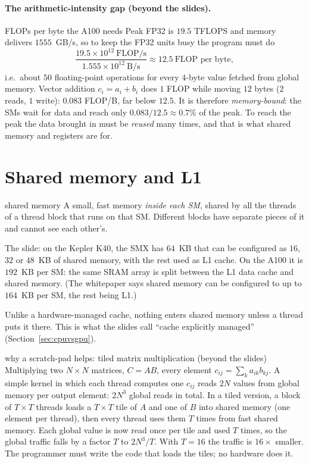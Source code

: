 \paragraph{The arithmetic-intensity gap (beyond the slides).}
\begin{workedex}{FLOPs per byte the A100 needs}
Peak FP32 is $19.5$ TFLOPS and memory delivers $1555$~GB/s, so to keep the FP32 units busy the program must do
\[
 \frac{19.5\times10^{12}\ \text{FLOP/s}}{1.555\times10^{12}\ \text{B/s}}\approx12.5\ \text{FLOP per byte},
\]
i.e.\ about $50$ floating-point operations for every $4$-byte value fetched from global memory. Vector addition $c_i=a_i+b_i$ does $1$ FLOP while moving $12$ bytes ($2$ reads, $1$ write): $0.083$ FLOP/B, far below $12.5$.
It is therefore \emph{memory-bound}: the SMs wait for data and reach only $0.083/12.5\approx0.7\%$ of the peak. To reach the peak the data brought in must be \emph{reused} many times, and that is what shared memory and registers are for.
\end{workedex}

\section{Shared memory and L1}


\begin{definition}{shared memory}
A small, fast memory \emph{inside each SM}, shared by all the threads of a thread block that runs on that SM. Different blocks have separate pieces of it and cannot see each other's.
\end{definition}
The slide: on the Kepler K40, the SMX has $64$~KB that can be configured as $16$, $32$ or $48$~KB of shared memory, with the rest used as L1 cache.
On the A100 it is $192$~KB per SM: the same SRAM array is split between the L1 data cache and shared memory. (The whitepaper says
shared memory can be configured to up to $164$~KB per SM, the rest being L1.)

Unlike a hardware-managed cache, nothing enters shared memory unless a thread puts it there. This is what the slides call
``cache explicitly managed'' (Section~\ref{sec:cpuvsgpu}).

\begin{workedex}{why a scratch-pad helps: tiled matrix multiplication (beyond the slides)}
Multiplying two $N\times N$ matrices, $C=AB$, every element $c_{ij}=\sum_k a_{ik}b_{kj}$.
A simple kernel in which each thread computes one $c_{ij}$ reads $2N$ values from global memory per output element: $2N^{3}$ global reads in total.
In a tiled version, a block of $T\times T$ threads loads a $T\times T$ tile of $A$ and one of $B$ into shared memory (one element per thread), then every thread uses them $T$ times
from fast shared memory. Each global value is now read once per tile and used $T$ times, so the global traffic falls by a factor $T$ to $2N^{3}/T$.
With $T=16$ the traffic is $16\times$ smaller. The programmer must write the code that loads the tiles; no hardware does it.
\end{workedex}

